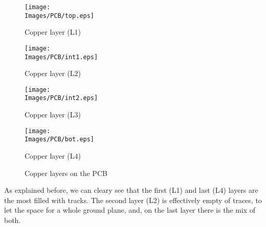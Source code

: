 \begin{figure}[!hbt]
    \centering
    \begin{minipage}[c]{\SmallSchematicWidth}
        \centering
        \texttt{[image: \\Images/PCB/top.eps]}
        \caption*{Copper layer (L1)}
    \end{minipage}%
    \hfill%
    \begin{minipage}[c]{\SmallSchematicWidth}
        \centering
        \texttt{[image: \\Images/PCB/int1.eps]}
        \caption*{Copper layer (L2)}
    \end{minipage}%
    \hfill%
    \begin{minipage}[c]{\SmallSchematicWidth}
        \centering
        \texttt{[image: \\Images/PCB/int2.eps]}
        \caption*{Copper layer (L3)}
    \end{minipage}%
    \hfill%
    \begin{minipage}[c]{\SmallSchematicWidth}
        \centering
        \texttt{[image: \\Images/PCB/bot.eps]}
        \caption*{Copper layer (L4)}
    \end{minipage}
    \label{img:layout}
    \caption{Copper layers on the PCB}
\end{figure}
\FloatBarrier

As explained before, we can cleary see that the first (L1) and last (L4) layers
are the most filled with tracks. The second layer (L2) is effectively empty of 
traces, to let the space for a whole ground plane, and, on the last layer there 
is the mix of both.
